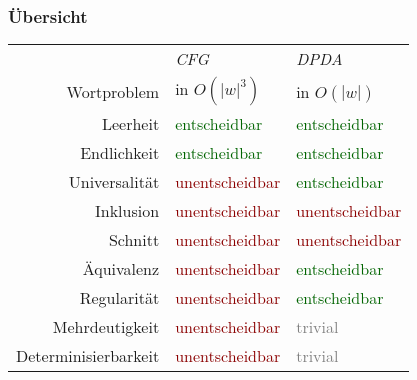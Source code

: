\documentclass[aspectratio=1610,onlymath]{beamer}
\begin{document}
\begin{frame}\frametitle{Übersicht}

\begin{tabular}{rll}
 & \emph{CFG} & \emph{DPDA}\\
Wortproblem
	& in $O(|w|^3)$
	& in $O(|w|)$\\[1ex]
Leerheit 
	& \textcolor{darkgreen}{entscheidbar}
	& \textcolor{darkgreen}{entscheidbar}\\
Endlichkeit
	& \textcolor{darkgreen}{entscheidbar}
	& \textcolor{darkgreen}{entscheidbar}\\
Universalität
	& \textcolor{darkred}{unentscheidbar}
	& \textcolor{darkgreen}{entscheidbar}\\[1ex]
Inklusion
	& \textcolor{darkred}{unentscheidbar}
	& \textcolor{darkred}{unentscheidbar}\\
Schnitt
	& \textcolor{darkred}{unentscheidbar}
	& \textcolor{darkred}{unentscheidbar}\\
Äquivalenz
	& \textcolor{darkred}{unentscheidbar}
	& \textcolor{darkgreen}{entscheidbar}\\[1ex]
Regularität
	& \textcolor{darkred}{unentscheidbar}
	& \textcolor{darkgreen}{entscheidbar}\\
Mehrdeutigkeit
	& \textcolor{darkred}{unentscheidbar}
	& \textcolor{gray}{trivial}\\
Determinisierbarkeit 
	& \textcolor{darkred}{unentscheidbar}
	& \textcolor{gray}{trivial}\\
\end{tabular}

\end{frame}

\end{document}
